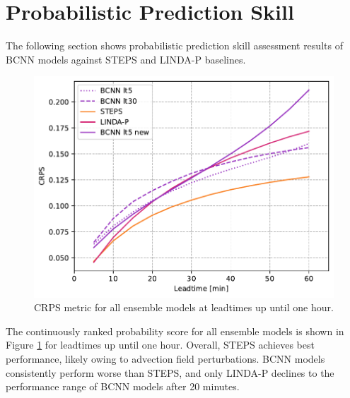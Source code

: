 \section{Probabilistic Prediction Skill}

The following section shows probabilistic prediction skill assessment results of BCNN models against STEPS and LINDA-P baselines.

\begin{figure}[H]
	\centering
	\includegraphics[width=0.5\linewidth]{images/metrics/ALL_CRPS}
	\caption{CRPS metric for all ensemble models at leadtimes up until one hour.}
	\label{fig:crps}
\end{figure}

The continuously ranked probability score for all ensemble models is shown in Figure \ref{fig:crps} for leadtimes up until one hour. Overall, STEPS achieves best performance, likely owing to advection field perturbations. BCNN models consistently perform worse than STEPS, and only LINDA-P declines to the performance range of BCNN models after 20 minutes.

